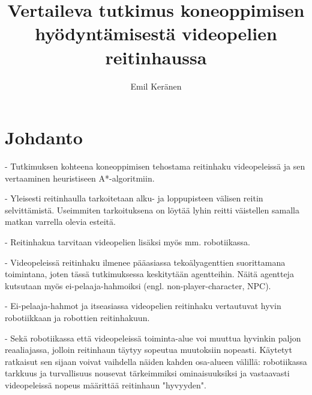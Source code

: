 \documentclass[utf8]{gradu3}
\begin{document}
\title{Vertaileva tutkimus koneoppimisen hyödyntämisestä videopelien reitinhaussa}

\author{Emil Keränen}

\maketitle

\bigskip

\mainmatter

\chapter{Johdanto}

- Tutkimuksen kohteena koneoppimisen tehostama reitinhaku videopeleissä
 ja sen vertaaminen heuristiseen A*-algoritmiin.

- Yleisesti reitinhaulla tarkoitetaan alku- ja loppupisteen välisen reitin selvittämistä. Useimmiten tarkoituksena
on löytää lyhin reitti väistellen samalla matkan varrella olevia esteitä.

- Reitinhakua tarvitaan videopelien lisäksi myös mm. robotiikassa. 

- Videopeleissä reitinhaku ilmenee pääasiassa tekoälyagenttien suorittamana toimintana, joten tässä tutkimuksessa keskitytään agentteihin.
Näitä agentteja kutsutaan myös ei-pelaaja-hahmoiksi (engl. non-player-character, NPC).

- Ei-pelaaja-hahmot ja itseasiassa videopelien reitinhaku vertautuvat hyvin robotiikkaan ja robottien reitinhakuun.

- Sekä robotiikassa että videopeleissä toiminta-alue voi muuttua hyvinkin paljon reaaliajassa, jolloin reitinhaun täytyy
sopeutua muutoksiin nopeasti. Käytetyt ratkaisut sen sijaan voivat vaihdella näiden kahden osa-alueen välillä: robotiikassa
tarkkuus ja turvallisuus nousevat tärkeimmiksi ominaisuuksiksi ja vastaavasti videopeleissä nopeus määrittää reitinhaun "hyvyyden".
\end{document}
